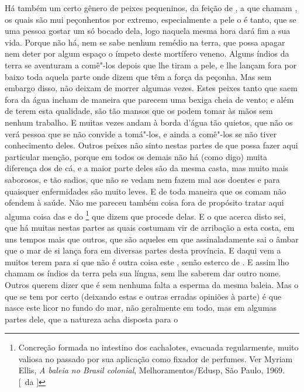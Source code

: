 Há também um certo gênero de peixes pequeninos, da feição de
, a que chamam , os quais são 
mui peçonhentos por extremo, especialmente a pele		%
o é tanto, que se uma pessoa gostar um só bocado dela, logo naquela
mesma hora dará fim a sua vida. Porque não há, nem se sabe nenhum
remédio na terra, que possa apagar nem deter por algum espaço o ímpeto
deste mortífero veneno. Alguns índios da terra se aventuram a comê"-los			%
depois que lhe tiram a pele, e lhe lançam fora por baixo toda aquela
parte onde dizem que têm a força da peçonha. Mas sem embargo disso, não
deixam de morrer algumas vezes. Estes peixes tanto que saem fora da água			%
incham de maneira que parecem uma bexiga cheia de vento; e além de terem
esta qualidade, são tão mansos que os podem tomar às mãos sem nenhum
trabalho. E muitas vezes andam à borda d'água tão
quietos, que não os verá pessoa que se não convide a tomá"-los, e ainda
a comê"-los se não tiver conhecimento deles. Outros peixes não sinto
nestas partes de que possa fazer aqui particular menção, porque em
todos os demais não há (como digo) muita diferença dos de cá, e a
maior parte deles são da mesma casta, mas muito mais saborosos, e tão sadios,
que não se vedam nem fazem mal aos doentes e para quaisquer
enfermidades são muito leves. E de toda maneira que os comam não			%
ofendem à saúde. Não me pareceu também coisa fora de propósito tratar
aqui alguma coisa das  e do \footnote{ Concreção formada no intestino
dos cachalotes, evacuada regularmente, muito valiosa no passado por sua aplicação como fixador
de perfumes. Ver Myriam Ellis, \textit{A baleia no Brasil colonial}, 
Melhoramentos/Edusp, São Paulo, 1969. [~da ]} que dizem que procede delas. E o
que acerca disto sei, que há muitas nestas partes as quais costumam vir
de arribação a esta costa, em uns tempos mais que outros, que são aqueles
em que assinaladamente sai o âmbar que o mar de si lança fora em
diversas partes desta província. E daqui vem a muitos terem para si que
não é outra coisa este , senão esterco de . E assim lho
chamam os índios da terra pela sua língua, sem lhe saberem dar outro			%
nome. Outros querem dizer que é sem nenhuma falta a esperma da mesma 
baleia. Mas o que se tem por certo (deixando estas e outras erradas
opiniões à parte) é que nasce este licor no fundo do mar, não geralmente
em todo, mas em algumas partes dele, que a natureza acha disposta para o
